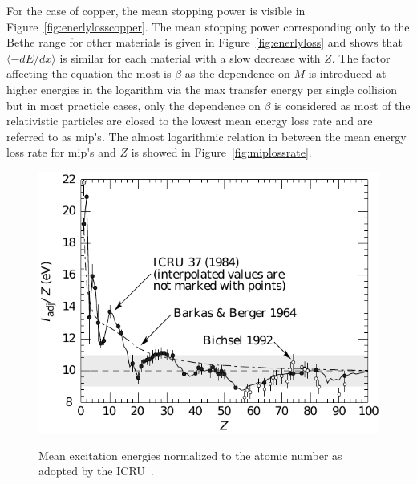 	For the case of copper, the mean stopping power is visible in Figure~\ref{fig:enerlylosscopper}. The mean stopping power corresponding only to the Bethe range for other materials is given in Figure~\ref{fig:enerlyloss} and shows that $\langle-dE/dx\rangle$ is similar for each material with a slow decrease with $Z$. The factor affecting the equation the most is $\beta$ as the dependence on $M$ is introduced at higher energies in the logarithm via the max transfer energy per single collision but in most practicle cases, only the dependence on $\beta$ is considered as most of the relativistic particles are closed to the lowest mean energy loss rate and are referred to as \acf{mip's}. The almost logarithmic relation in between the mean energy loss rate for \acl{mip's} and $Z$ is showed in Figure~\ref{fig:miplossrate}.
	
	\begin{figure}[H]
		\centering
		\includegraphics[width = 0.8\plotwidth]{fig/chapt4/Iadj_pegs_adndt.pdf}\\
		\caption{\label{fig:excitationenergy} Mean excitation energies normalized to the atomic number as adopted by the ICRU~\cite{ICRU37,ICRU49,PDG2018}.}
	\end{figure}
	
